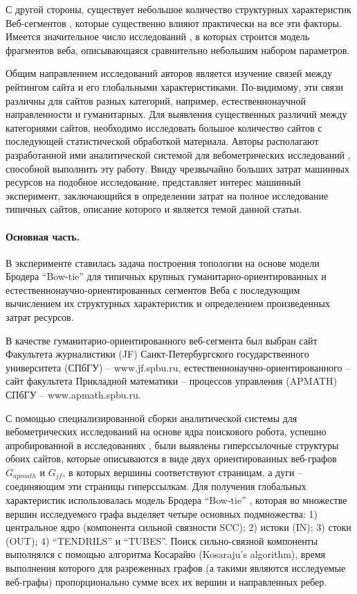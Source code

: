 С другой стороны, существует небольшое количество структурных характеристик Веб-сегментов \cite{ChoRoy}, которые существенно влияют практически на все эти факторы. Имеется значительное число исследований \cite{Kleinberg,ChoRoy,BroderKumarMaghoul,AguilloGranadinoOrtega,StuartThelwallHarries,Chakrabarti,Thelwall,Pechnikov,PechnikovNwohiri}, в которых строится модель фрагментов веба, описывающаяся сравнительно небольшим набором параметров.

Общим направлением исследований авторов является изучение связей между рейтингом сайта и его глобальными характеристиками. По-видимому, эти связи различны для сайтов разных категорий, например, естественнонаучной направленности и гуманитарных. Для выявления существенных различий между категориями сайтов, необходимо исследовать большое количество сайтов с последующей статистической обработкой материала. Авторы располагают разработанной ими аналитической системой для вебометрических исследований \cite{BlekanovSergeevMaksimov,BlekanovSergeevMartynenko}, способной выполнить эту работу. Ввиду чрезвычайно больших затрат машинных ресурсов на подобное исследование, представляет интерес машинный эксперимент, заключающийся в определении затрат на полное исследование типичных сайтов, описание которого и является темой данной статьи.

\paragraph{Основная часть.} В эксперименте ставилась задача построения топологии на основе модели Бродера “Bow-tie” \cite{BroderKumarMaghoul,Thelwall} для типичных крупных гуманитарно-ориентированных и естественнонаучно-ориентированных сегментов Веба с последующим вычислением их структурных характеристик и определением произведенных затрат ресурсов.

В качестве гуманитарно-ориентированного веб-сегмента был выбран сайт Факультета журналистики (JF) Санкт-Петербургского государственного университета (СПбГУ) -- www.jf.spbu.ru, естественнонаучно-ориентированного -- сайт факультета Прикладной математики -- процессов управления (APMATH) СПбГУ -- www.apmath.spbu.ru.

С помощью специализированной сборки аналитической системы для вебометрических исследований на основе ядра поискового робота, успешно апробированной в исследованиях \cite{BlekanovSergeev,MaksimovBlekanov} , были выявлены гиперссылочные структуры обоих сайтов, которые описываются в виде двух ориентированных веб-графов \(G_{apmath}\) и \(G_{jf}\), в которых вершины соответствуют страницам, а дуги – соединяющим эти страницы гиперссылкам. Для получения глобальных характеристик использовалась модель Бродера “Bow-tie” \cite{BroderKumarMaghoul}, которая во множестве вершин исследуемого графа выделяет четыре основных подмножества: 1) центральное ядро (компонента сильной связности SCC); 2) истоки (IN); 3) стоки (OUT); 4) “TENDRILS” и “TUBES”. Поиск сильно-связной компоненты выполнялся с помощью алгоритма Косарайю \cite{Sedgewick} (Kosaraju's algorithm), время выполнения которого для разреженных графов (а такими являются исследуемые веб-графы) пропорционально сумме всех их вершин и направленных ребер.

